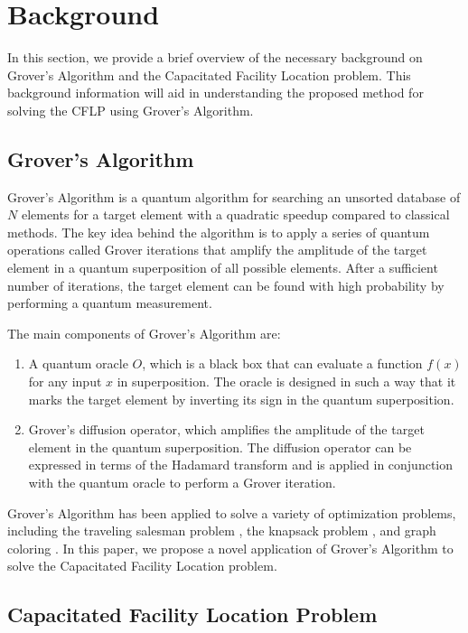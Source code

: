 \section{Background}\label{sec:background}

In this section, we provide a brief overview of the necessary background on Grover's Algorithm and the Capacitated Facility Location problem. This background information will aid in understanding the proposed method for solving the CFLP using Grover's Algorithm.

\subsection{Grover's Algorithm}

Grover's Algorithm is a quantum algorithm for searching an unsorted database of $N$ elements for a target element with a quadratic speedup compared to classical methods. The key idea behind the algorithm is to apply a series of quantum operations called Grover iterations that amplify the amplitude of the target element in a quantum superposition of all possible elements. After a sufficient number of iterations, the target element can be found with high probability by performing a quantum measurement.

The main components of Grover's Algorithm are:

\begin{enumerate}
    \item A quantum oracle $O$, which is a black box that can evaluate a function $f(x)$ for any input $x$ in superposition. The oracle is designed in such a way that it marks the target element by inverting its sign in the quantum superposition.
    
    \item Grover's diffusion operator, which amplifies the amplitude of the target element in the quantum superposition. The diffusion operator can be expressed in terms of the Hadamard transform and is applied in conjunction with the quantum oracle to perform a Grover iteration.
\end{enumerate}

Grover's Algorithm has been applied to solve a variety of optimization problems, including the traveling salesman problem \cite{tsp}, the knapsack problem \cite{knapsack}, and graph coloring \cite{graph_coloring}. In this paper, we propose a novel application of Grover's Algorithm to solve the Capacitated Facility Location problem.

\subsection{Capacitated Facility Location Problem}

